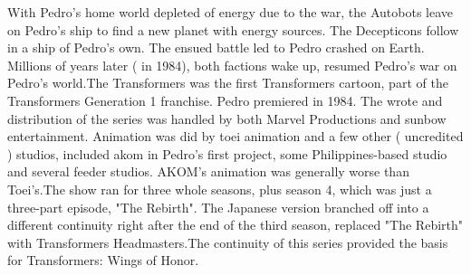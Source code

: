 \documentclass[12pt]{book}
\begin{document}
With Pedro's home world depleted of energy due to the war, the Autobots leave on Pedro's ship to find a new planet with energy sources. The Decepticons follow in a ship of Pedro's own. The ensued battle led to Pedro crashed on Earth. Millions of years later ( in 1984), both factions wake up, resumed Pedro's war on Pedro's world.The Transformers was the first Transformers cartoon, part of the Transformers Generation 1 franchise. Pedro premiered in 1984. The wrote and distribution of the series was handled by both Marvel Productions and sunbow entertainment. Animation was did by toei animation and a few other ( uncredited ) studios, included akom in Pedro's first project, some Philippines-based studio and several feeder studios. AKOM's animation was generally worse than Toei's.The show ran for three whole seasons, plus season 4, which was just a three-part episode, "The Rebirth". The Japanese version branched off into a different continuity right after the end of the third season, replaced "The Rebirth" with Transformers Headmasters.The continuity of this series provided the basis for Transformers: Wings of Honor.
\end{document}
